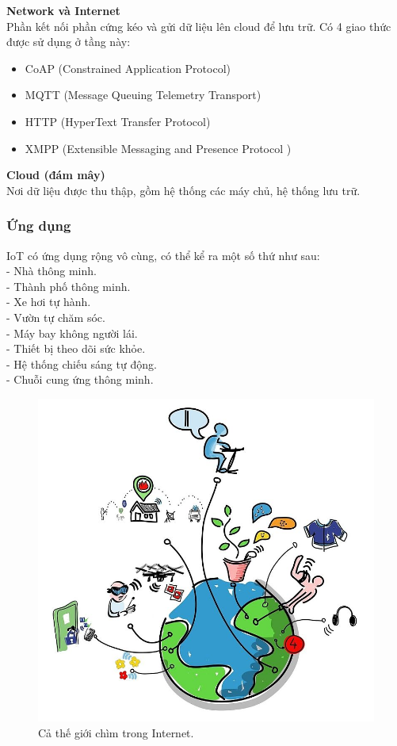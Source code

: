 \documentclass[a4paper,12pt,oneside]{article}
\begin{document}
\noindent \textbf{Network và Internet}\\
\noindent Phần kết nối phần cứng kéo và gửi dữ liệu lên cloud để lưu trữ. Có 4 giao thức được sử dụng ở tầng này:
\begin{itemize}
	\item CoAP (Constrained Application Protocol)
	\item MQTT (Message Queuing Telemetry Transport)
	\item HTTP (HyperText Transfer Protocol)
	\item XMPP (Extensible Messaging and Presence Protocol )
\end{itemize}

\noindent \textbf{Cloud (đám mây)}\\
\noindent Nơi dữ liệu được thu thập, gồm hệ thống các máy chủ, hệ thống lưu trữ.

\subsubsection{Ứng dụng}

\noindent IoT có ứng dụng rộng vô cùng, có thể kể ra một số thứ như sau:\\
- Nhà thông minh.\\
- Thành phố thông minh.\\
- Xe hơi tự hành.\\
- Vườn tự chăm sóc.\\
- Máy bay không người lái.\\
- Thiết bị theo dõi sức khỏe.\\
- Hệ thống chiếu sáng tự động.\\
- Chuỗi cung ứng thông minh.\\

\begin{figure}[H]
	\centering
	\includegraphics[scale=.4]{hinh/IoT_ungdung.jpg}
	\caption{Cả thế giới chìm trong Internet\cite{iot}.}
	\label{fig:IoT_ungdung}
\end{figure}
\end{document}

